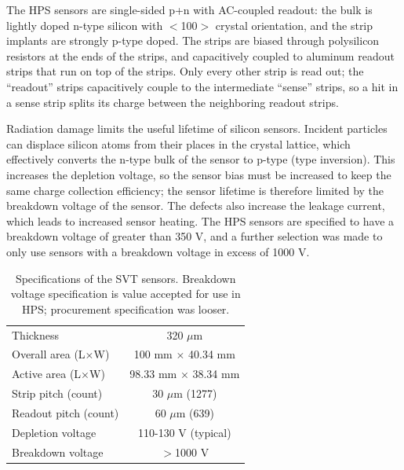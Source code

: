 The HPS sensors are single-sided p+n with AC-coupled readout: the bulk is lightly doped n-type silicon with $<$100$>$ crystal orientation, and the strip implants are strongly p-type doped.
The strips are biased through polysilicon resistors at the ends of the strips, and capacitively coupled to aluminum readout strips that run on top of the strips.
Only every other strip is read out; the ``readout'' strips capacitively couple to the intermediate ``sense'' strips, so a hit in a sense strip splits its charge between the neighboring readout strips.

Radiation damage limits the useful lifetime of silicon sensors.
Incident particles can displace silicon atoms from their places in the crystal lattice, which effectively converts the n-type bulk of the sensor to p-type (type inversion).
This increases the depletion voltage, so the sensor bias must be increased to keep the same charge collection efficiency; the sensor lifetime is therefore limited by the breakdown voltage of the sensor.
The defects also increase the leakage current, which leads to increased sensor heating.
The HPS sensors are specified to have a breakdown voltage of greater than 350 V, and a further selection was made to only use sensors with a breakdown voltage in excess of 1000 V.

\begin{table}[htp]
    \begin{center}
        \caption{Specifications of the SVT sensors.
        Breakdown voltage specification is value accepted for use in HPS; procurement specification was looser.}
        \begin{tabular}{lc}   
            \hline \hline
            Thickness & 320 $\mu$m \\
            Overall area (L$\times$W) & 100 mm $\times$ 40.34 mm\\
            Active area (L$\times$W) & 98.33 mm $\times$ 38.34 mm\\
            Strip pitch (count) & 30 $\mu$m (1277)\\
            Readout pitch (count) & 60 $\mu$m (639)\\
            Depletion voltage & 110-130 V (typical)\\
            Breakdown voltage & $>$1000 V\\
            \hline \hline
        \end{tabular}
        \label{tab:sensor_spec} 
    \end{center}
\end{table}

